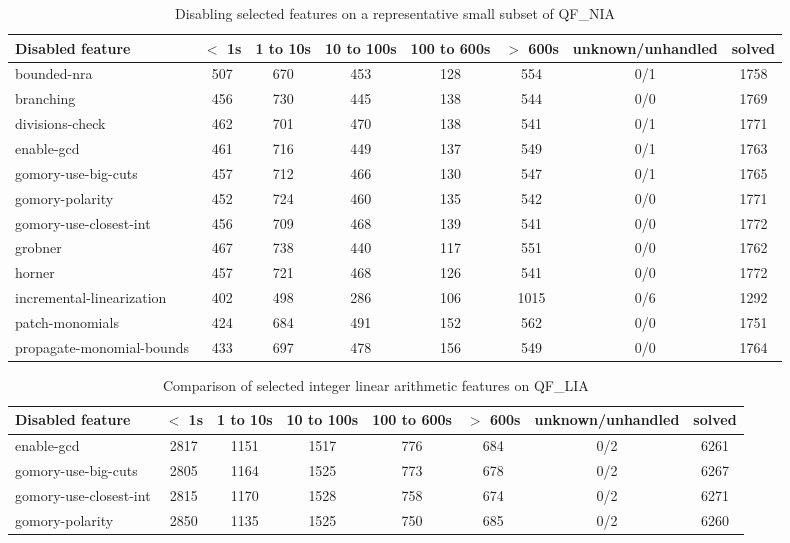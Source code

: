 \begin{table}
  \begin{tabular}{|l|c|c|c|c|c|c|c|}
    \hline
    Disabled feature & $<$ 1s & 1 to 10s & 10 to 100s & 100 to 600s & $>$ 600s & unknown/unhandled & solved \\
    \hline
    bounded-nra & 507 & 670 & 453 & 128 & 554 & 0/1 & 1758 \\
    \hline
    branching & 456 & 730 & 445 & 138 & 544 & 0/0 & 1769 \\
    \hline
    divisions-check & 462 & 701 & 470 & 138 & 541 & 0/1 & 1771 \\
    \hline
    enable-gcd & 461 & 716 & 449 & 137 & 549 & 0/1 & 1763 \\
    \hline
    gomory-use-big-cuts & 457 & 712 & 466 & 130 & 547 & 0/1 & 1765 \\
    \hline
    gomory-polarity & 452 & 724 & 460 & 135 & 542 & 0/0 & 1771 \\
    \hline
    gomory-use-closest-int & 456 & 709 & 468 & 139 & 541 & 0/0 & 1772 \\
    \hline
    grobner & 467 & 738 & 440 & 117 & 551 & 0/0 & 1762 \\
    \hline
    horner & 457 & 721 & 468 & 126 & 541 & 0/0 & 1772 \\
    \hline
    incremental-linearization & 402 & 498 & 286 & 106 & 1015 & 0/6 & 1292 \\
    \hline
    patch-monomials & 424 & 684 & 491 & 152 & 562 & 0/0 & 1751 \\
    \hline
    propagate-monomial-bounds & 433 & 697 & 478 & 156 & 549 & 0/0 & 1764 \\
    \hline
    \end{tabular}
  \caption{Disabling selected features on a representative small subset of QF\_NIA \label{tab:qf-nia-small}}
\end{table}


\begin{table}
  \begin{tabular}{|l|c|c|c|c|c|c|c|}
    \hline
    Disabled feature & $<$ 1s & 1 to 10s & 10 to 100s & 100 to 600s & $>$ 600s & unknown/unhandled & solved \\
    \hline
    enable-gcd & 2817 & 1151 & 1517 & 776 & 684 & 0/2 & 6261 \\
    \hline
    gomory-use-big-cuts & 2805 & 1164 & 1525 & 773 & 678 & 0/2 & 6267 \\
    \hline
    gomory-use-closest-int & 2815 & 1170 & 1528 & 758 & 674 & 0/2 & 6271 \\
    \hline
    gomory-polarity & 2850 & 1135 & 1525 & 750 & 685 & 0/2 & 6260 \\
    \hline
    \end{tabular}
  \caption{Comparison of selected integer linear arithmetic features on QF\_LIA \label{tab:qf-lia}}
\end{table}


